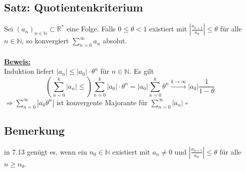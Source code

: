 \subsection{Satz: Quotientenkriterium} %
\label{sub:satz_quotientenkriterium}
Sei $(a_n)_{n \in \mathds{N}} \subset \mathds{R}^*$ eine Folge.
Falls $0 \leq \theta < 1$ existiert mit $ \left|\frac{a_{n+1}}{a_n} \right| \leq \theta$ für alle $n \in \mathds{N}$, so konvergiert $\sum\limits_{n=0}^{\infty} a_n $ absolut. \\
\vspace{\baselineskip} \\
\underline{\textbf{Beweis:}} \\
Induktion liefert $|a_n| \leq |a_0| \cdot \theta^n$ für $n \in \mathds{N}$. Es gilt
\[
	\left( \sum\limits_{n=0}^{k} |a_n| \leq \right) \sum\limits_{n=0}^{k} |a_0| \cdot \theta^n
	= |a_0| \sum\limits_{n=0}^{k} \theta^n \xrightarrow{k \to \infty} |a_0| \frac{1}{1-\theta} \tag{geometrische Reihe}
\]
$\Rightarrow \sum\limits_{n=0}^{\infty} |a_0 \theta^n|$ ist konvergente Majorante für $\sum\limits_{n=0}^{\infty} |a_n|$ \hfill $\square$ 

\subsection{Bemerkung} %
\label{sub:bemerkung}
in 7.13 genügt es, wenn ein $n_0 \in \mathds{N}$ existiert mit $a_n \not= 0$ und $|\frac{a_{n+1}}{a_n}| \leq \theta$ für alle $n \geq n_0$.

